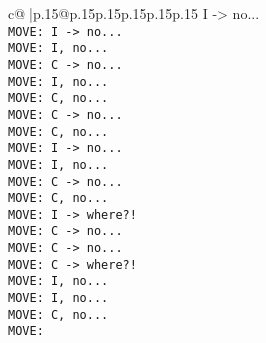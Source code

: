 \documentclass{article}
\begin{document}
{\begin{supertabular}{c@{$\;$}|p{.15\linewidth}@{}p{.15\linewidth}p{.15\linewidth}p{.15\linewidth}p{.15\linewidth}p{.15\linewidth}}
{{{I -> no...\\ \tt  MOVE: I -> no...\\ \tt  MOVE: I, no...\\ \tt  MOVE: C -> no...\\ \tt  MOVE: I, no...\\ \tt  MOVE: C, no...\\ \tt  MOVE: C -> no...\\ \tt  MOVE: C, no...\\ \tt  MOVE: I -> no...\\ \tt  MOVE: I, no...\\ \tt  MOVE: C -> no...\\ \tt  MOVE: C, no...\\ \tt  MOVE: I -> where?!\\ \tt  MOVE: C -> no...\\ \tt  MOVE: C -> no...\\ \tt  MOVE: C -> where?!\\ \tt  MOVE: I, no...\\ \tt  MOVE: I, no...\\ \tt  MOVE: C, no...\\ \tt  MOVE:}}}
\end{supertabular}}
\end{document}

